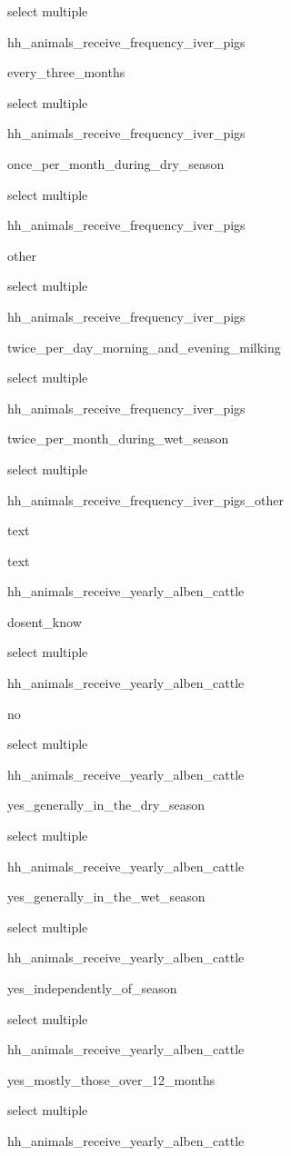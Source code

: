 \documentclass[]{article}
\begin{document}
select multiple

hh\_animals\_receive\_frequency\_iver\_pigs

every\_three\_months

select multiple

hh\_animals\_receive\_frequency\_iver\_pigs

once\_per\_month\_during\_dry\_season

select multiple

hh\_animals\_receive\_frequency\_iver\_pigs

other

select multiple

hh\_animals\_receive\_frequency\_iver\_pigs

twice\_per\_day\_morning\_and\_evening\_milking

select multiple

hh\_animals\_receive\_frequency\_iver\_pigs

twice\_per\_month\_during\_wet\_season

select multiple

hh\_animals\_receive\_frequency\_iver\_pigs\_other

text

text

hh\_animals\_receive\_yearly\_alben\_cattle

dosent\_know

select multiple

hh\_animals\_receive\_yearly\_alben\_cattle

no

select multiple

hh\_animals\_receive\_yearly\_alben\_cattle

yes\_generally\_in\_the\_dry\_season

select multiple

hh\_animals\_receive\_yearly\_alben\_cattle

yes\_generally\_in\_the\_wet\_season

select multiple

hh\_animals\_receive\_yearly\_alben\_cattle

yes\_independently\_of\_season

select multiple

hh\_animals\_receive\_yearly\_alben\_cattle

yes\_mostly\_those\_over\_12\_months

select multiple

hh\_animals\_receive\_yearly\_alben\_cattle
\end{document}
